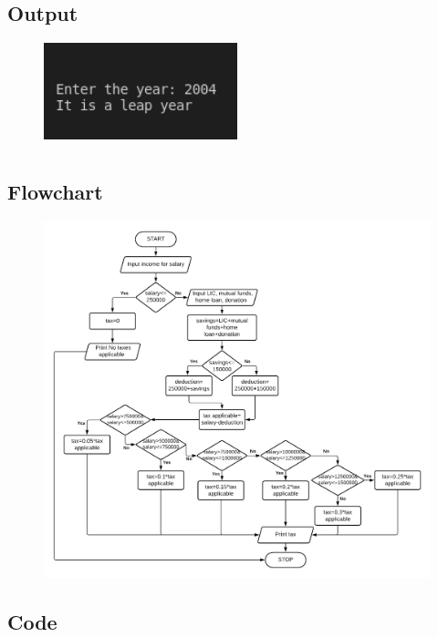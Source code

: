 \documentclass[12pt]{article}
\begin{document}
\subsection{Output}
\begin{figure}[h]
    \centering
    \includegraphics[width=0.5\textwidth]{2.png}
\end{figure}
\newpage
\section{}
\subsection{Flowchart}
\begin{figure}[h]
    \centering
    \includegraphics[width=1.1\textwidth]{Flowchart03.png}
\end{figure}
\newpage
\subsection{Code}
\inputminted{c}{q3.c}
\end{document}
